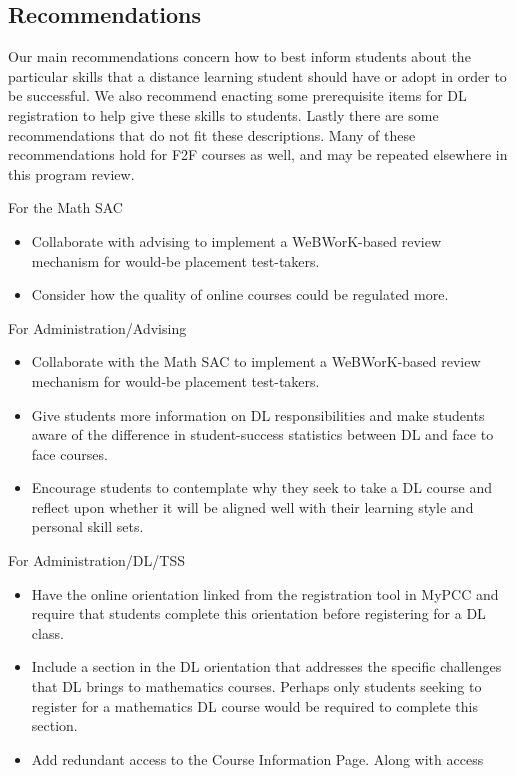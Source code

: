 \subsection{Recommendations}
Our main recommendations concern how to best inform students about the
particular skills that a distance learning student should have or adopt in order
to be successful. We also recommend enacting some prerequisite items for DL
registration to help give these skills to students. Lastly there are some
recommendations that do not fit these descriptions. Many of these
recommendations hold for F2F courses as well, and may be repeated elsewhere in
this program review. 
\begin{description}
\item For the Math SAC
\begin{itemize}
\item Collaborate with advising to implement a WeBWorK-based review mechanism
  for would-be placement test-takers.
\item Consider how the quality of online courses could be regulated more. 
\end{itemize}
\item For Administration/Advising
\begin{itemize}
\item Collaborate with the Math SAC to implement a WeBWorK-based review
  mechanism for would-be placement test-takers.
\item Give students more information on DL responsibilities and make students
  aware of the difference in student-success statistics between DL and face to
  face courses.
\item Encourage students to contemplate why they seek to take a DL course and
  reflect upon whether it will be aligned well with their learning style and
  personal skill sets.
\end{itemize}
\item For Administration/DL/TSS
\begin{itemize}
\item Have the online orientation linked from the registration tool in MyPCC and
  require that students complete this orientation before registering for a DL
  class.
\item Include a section in the DL orientation that addresses the specific
  challenges that DL brings to mathematics courses. Perhaps only students
  seeking to register for a mathematics DL course would be required to complete
  this section.
\item Add redundant access to the Course Information Page. Along with access

\end{itemize}
\end{description}
